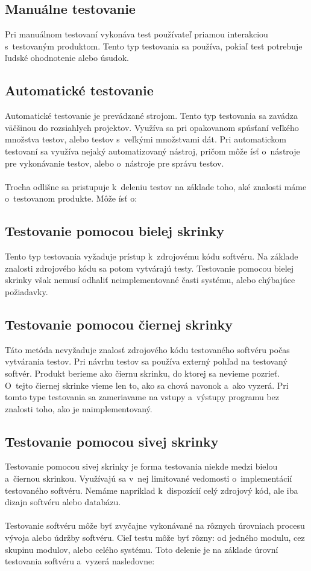 \subsection*{Manuálne testovanie}
Pri manuálnom testovaní vykonáva test používateľ priamou interakciou s~testovaným produktom. 
Tento typ testovania sa používa, pokiaľ test potrebuje ľudské ohodnotenie alebo úsudok.

\subsection*{Automatické testovanie}
Automatické testovanie je prevádzané strojom.
Tento typ testovania sa zavádza väčšinou do rozsiahlych projektov.
Využíva sa pri opakovanom spúsťaní veľkého množstva testov, alebo testov s~veľkými množstvami dát.
Pri automatickom testovaní sa využíva nejaký automatizovaný nástroj, pričom môže ísť o~nástroje 
pre vykonávanie testov, alebo o~nástroje pre správu testov.
\\
\\
Trocha odlišne sa pristupuje k~deleniu testov na základe toho, aké znalosti máme o~testovanom produkte.
Môže ísť o:
\subsection*{Testovanie pomocou bielej skrinky}
Tento typ testovania vyžaduje prístup k~zdrojovému kódu softvéru. Na základe znalosti zdrojového kódu sa potom vytvárajú testy.
Testovanie pomocou bielej skrinky však nemusí odhaliť neimplementované časti systému, alebo chýbajúce požiadavky.
\subsection*{Testovanie pomocou čiernej skrinky} \label{sekcia:cierna_skrinka}
Táto metóda nevyžaduje znalosť zdrojového kódu testovaného softvéru počas vytvárania testov.
Pri návrhu testov sa používa externý pohľad na testovaný softvér. 
Produkt berieme ako čiernu skrinku, do ktorej sa nevieme pozrieť.
O~tejto čiernej skrinke vieme len to, ako sa chová navonok a~ako vyzerá.
Pri tomto type testovania sa zameriavame na vstupy a~výstupy programu bez znalosti toho, ako je naimplementovaný.
\subsection*{Testovanie pomocou sivej skrinky}
Testovanie pomocou sivej skrinky je forma testovania niekde medzi bielou a~čiernou skrinkou. 
Využívajú sa v~nej limitované vedomosti o~implementácií testovaného softvéru.
Nemáme napríklad k~dispozícií celý zdrojový kód, ale iba dizajn softvéru alebo databázu.
\\
\\
Testovanie softvéru môže byť zvyčajne vykonávané na rôznych úrovniach 
procesu vývoja alebo údržby softvéru. Cieľ testu môže byť rôzny: od jedného
modulu, cez skupinu modulov, alebo celého systému.
Toto delenie je na základe úrovní testovania softvéru a~vyzerá nasledovne:
